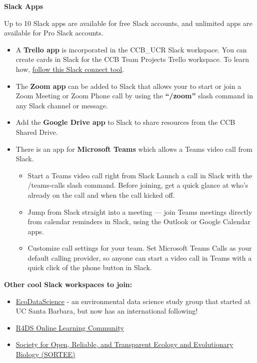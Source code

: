 \documentclass[
]{book}
\providecommand{\tightlist}{%
  \setlength{\itemsep}{0pt}\setlength{\parskip}{0pt}}
\begin{document}
\textbf{Slack Apps}

Up to 10 Slack apps are available for free Slack accounts, and unlimited apps are available for Pro Slack accounts.

\begin{itemize}
\tightlist
\item
  A \textbf{Trello app} is incorporated in the CCB\_UCR Slack workspace. You can create cards in Slack for the CCB Team Projects Trello workspace. To learn how, \href{https://slack.com/help/articles/231967387-Trello-for-Slack}{follow this Slack connect tool}.
\item
  The \textbf{Zoom app} can be added to Slack that allows your to start or join a Zoom Meeting or Zoom Phone call by using the \textbf{``/zoom''} slash command in any Slack channel or message.
\item
  Add the \textbf{Google Drive app} to Slack to share resources from the CCB Shared Drive.
\item
  There is an app for \textbf{Microsoft Teams} which allows a Teams video call from Slack.

  \begin{itemize}
  \tightlist
  \item
    Start a Teams video call right from Slack
    Launch a call in Slack with the /teams-calls slash command. Before joining, get a quick glance at who's already on the call and when the call kicked off.
  \item
    Jump from Slack straight into a meeting --- join Teams meetings directly from calendar reminders in Slack, using the Outlook or Google Calendar apps.
  \item
    Customize call settings for your team. Set Microsoft Teams Calls as your default calling provider, so anyone can start a video call in Teams with a quick click of the phone button in Slack.
  \end{itemize}
\end{itemize}

\textbf{Other cool Slack workspaces to join:}

\begin{itemize}
\item
  \href{https://eco-data-science.github.io/}{EcoDataScience} - an environmental data science study group that started at UC Santa Barbara, but now has an international following!
\item
  \href{https://www.rfordatasci.com}{R4DS Online Learning Community}
\item
  \href{https://www.sortee.org}{Society for Open, Reliable, and Transparent Ecology and Evolutionary Biology (SORTEE)}
\end{itemize}
\end{document}
